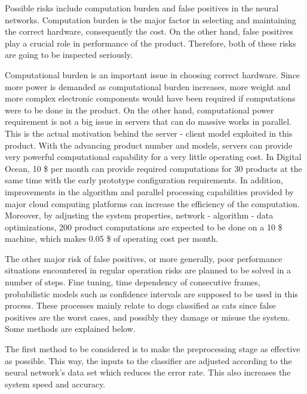 Possible risks include computation burden and false positives in the neural networks. Computation burden is the major factor in selecting and maintaining the correct hardware, consequently the cost. On the other hand, false positives play a crucial role in performance of the product. Therefore, both of these risks are going to be inspected seriously.

Computational burden is an important issue in choosing correct hardware. Since more power is demanded as computational burden increases, more weight and more complex electronic components would have been required if computations were to be done in the product. On the other hand, computational power requirement is not a big issue in servers that can do massive works in parallel. This is the actual motivation behind the server - client model exploited in this product. With the advancing product number and models, servers can provide very powerful computational capability for a very little operating cost. In Digital Ocean, 10 \$ per month can provide required computations for 30 products at the same time with the early prototype configuration requirements. In addition, improvements in the algorithm and parallel processing capabilities provided by major cloud computing platforms can increase the efficiency of the computation. Moreover, by adjusting the system properties, network - algorithm - data optimizations, 200 product computations are expected to be done on a 10 \$ machine, which makes 0.05 \$ of operating cost per month.

The other major risk of false positives, or more generally, poor performance situations encountered in regular operation risks are planned to be solved in a number of steps. Fine tuning, time dependency of consecutive frames, probabilistic models such as confidence intervals are supposed to be used in this process. These processes mainly relate to dogs classified as cats since false positives are the worst cases, and possibly they damage or misuse the system. Some methods are explained below.

The first method to be considered is to make the preprocessing stage as effective as possible. This way, the inputs to the classifier are adjusted according to the neural network's data set which reduces the error rate. This also increases the system speed and accuracy. 

